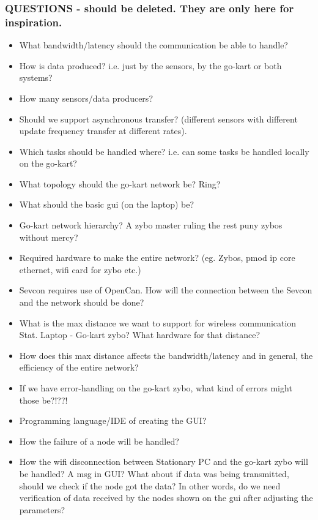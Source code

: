 \subsubsection{QUESTIONS - should be deleted. They are only here for inspiration.}
\begin{itemize}{}
\item What bandwidth/latency should the communication be able to handle?
\item How is data produced? i.e. just by the sensors, by the go-kart or both systems?
\item How many sensors/data producers?\\
\item Should we support asynchronous transfer? (different sensors with different 
update frequency transfer at different rates).\\
\item Which tasks should be handled where? i.e. can some tasks be handled locally on 
the go-kart?
\item What topology should the go-kart network be? Ring?
\item What should the basic gui (on the laptop) be?
\item Go-kart network hierarchy? A zybo master ruling the rest puny zybos without mercy?
\item Required hardware to make the entire network? (eg. Zybos, pmod ip core ethernet, wifi card for zybo etc.)
\item Sevcon requires use of OpenCan. How will the connection between the Sevcon and the network should be done?
\item What is the max distance we want to support for wireless communication Stat. Laptop - Go-kart zybo? What hardware for that distance?
\item How does this max distance affects the bandwidth/latency and in general, the efficiency of the entire network?
\item If we have error-handling on the go-kart zybo, what kind of errors might those be?!??!
\item Programming language/IDE of creating the GUI?
\item How the failure of a node will be handled?
\item How the wifi disconnection between Stationary PC and the go-kart zybo will be handled? A msg in GUI? What about if data was being transmitted, should we check if the node got the data? In other words, do we need verification of data received by the nodes shown on the gui after adjusting the parameters?

\end{itemize}



